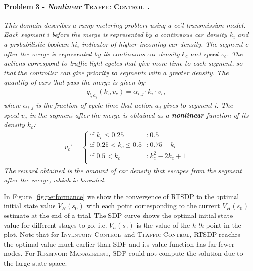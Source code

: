 \documentclass[letterpaper]{article}
\newcommand{\Invent}{\textsc{Inventory Control}}
\newcommand{\Traffic}{\textsc{Traffic Control}}
\newcommand{\Reservoir}{\textsc{Reservoir Management}}
\begin{document}
\paragraph{\bf Problem 3 - \emph{Nonlinear} \Traffic~\cite{daganzo1994cell}. \label{ex3}}
\textit{This domain describes a ramp metering problem using a cell transmission model. Each segment $i$ before the merge is represented by a continuous car density $k_i$ and a probabilistic boolean $hi_i $ indicator of higher incoming car density. The segment $c$ after the merge is represented by its continuous car density $k_c$ and speed $v_c$.
The actions correspond to traffic light cycles that give more time to each segment, so that the controller can give priority to segments with a greater density. The quantity of cars that pass the merge is given by:
\begin{align*}
q_{i,a_j} (k_i, v_c) = \alpha_{i,j} \cdot k_i \cdot v_c,
\end{align*} 
where $\alpha_{i,j}$ is the fraction of cycle time that action $a_j$ gives to segment $i$.
The speed $v_c$ in the segment after the merge is obtained as a {\bf nonlinear} function of its density $k_c$:
{\small
\begin{align*}
v_c' =
\begin{cases}
  \text{if }  k_c \leq 0.25 & : 0.5\\ 
  \text{if }  0.25 < k_c \leq 0.5 &:  0.75 - k_c\\ 
  \text{if }  0.5 < k_c &: k_c^2 - 2k_c +1\\ 
\end{cases}
\end{align*}
}
The reward obtained is the amount of car density that escapes from the segment after the merge, which is bounded.
\vspace{0.6mm}
}

In Figure~\ref{fig:performance} we show the convergence of RTSDP to the optimal initial state value $V_H(s_0)$ with each point corresponding to the current $V_H(s_0)$ estimate at the end of a trial.
The SDP curve shows the optimal initial state value for different stages-to-go, i.e. $V_h(s_0)$ is the value of the {\it h-th} point in the plot. 
Note that for \Invent~and \Traffic, RTSDP reaches the optimal value much earlier than SDP and its value function has far fewer nodes. For \Reservoir, SDP could not compute the solution due to the large state space.
\end{document}
